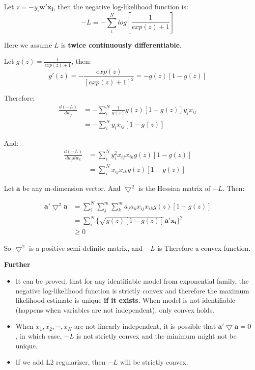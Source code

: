 \documentclass{article}
\newcommand{\V}[1]{\boldsymbol{#1}}
\newcommand{\TM}{\bigtriangledown}
\begin{document}
Let \(z=-y_i\V{w'}\V{x_i}\), then the negative log-likelihood function is:
\begin{equation}
-L=-\sum_{i}^{N}log[\frac{1}{exp(z)+1}]
\end{equation}

Here we assume \(L\) is \textbf{twice continuously differentiable}.

Let \(g(z)=\frac{1}{exp(z)+1}\), then:
\begin{equation}
g'(z)=-\frac{exp(z)}{[exp(z)+1]^2}=-g(z)[1-g(z)]
\end{equation}

Therefore:
\begin{equation}
\begin{split}
\frac{d(-L)}{dw_j}&=-\sum_{i}^N\frac{1}{g(z)}g(z)[1-g(z)]y_ix_{ij}\\
&=-\sum_{i}^Ny_ix_{ij}[1-g(z)]
\end{split}
\end{equation}

And:
\begin{equation}
\begin{split}
\frac{d(-L)}{dw_jdw_k}&=\sum_{i}^Ny_i^2x_{ij}x_{ik}g(z)[1-g(z)]\\
&=\sum_{i}^Nx_{ij}x_{ik}g(z)[1-g(z)]
\end{split}
\end{equation}

Let \(\V{a}\) be any m-dimension vector. And \(\TM^2\) is the Hessian matrix
of \(-L\). Then:

\begin{equation}
\begin{split}
\V{a'}\TM^2\V{a}&=\sum_{i}^N\sum_{j}^m\sum_{k}^ma_ja_kx_{ij}x_{ik}g(z)[1-g(z)]\\
&=\sum_{i}^N{\{\sqrt{g(z)[1-g(z)]}\V{a'}\V{x_i}\}^2}\\
&\geq 0
\end{split}
\end{equation}

So \(\TM^2\) is a positive semi-definite matrix, and \(-L\) is Therefore
a convex function.

\vspace{2mm}
\textbf{Further}
\begin{itemize}
\item It can be proved, that for any identifiable model from exponential family,
the negative log-likelihood function is strictly convex and therefore
the maximum likelihood estimate is unique \textbf{if it exists}. When model
is not identifiable (happens when variables are not independent), only
convex holds.
\item When \(x_1, x_2, \cdots, x_N\) are not linearly independent, it is possible
that \(\V{a'}\TM\V{a}=0\), in which case, \(-L\) is not strictly convex and
the minimum might not be unique.
\item If we add L2 regularizer, then \(-L\) will be strictly convex.
\end{itemize}
\end{document}
